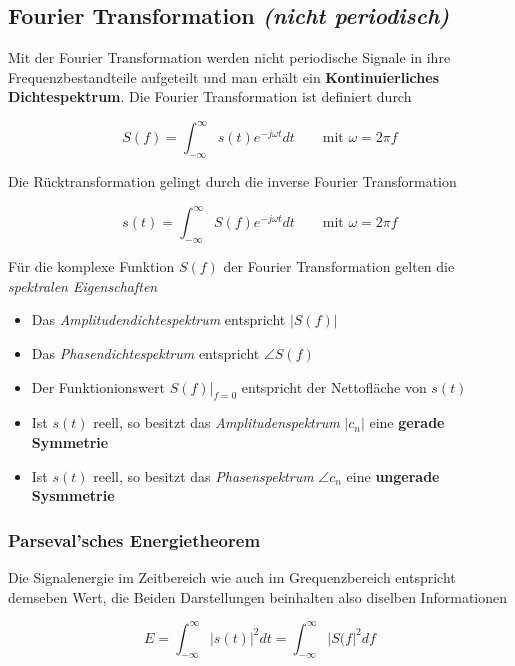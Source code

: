 \documentclass[
  10pt,
  a4paper,
  german]{article}
\numberwithin{equation}{section}
\begin{document}
\hypertarget{fourier-transformation-nicht-periodisch}{%
\subsection{\texorpdfstring{Fourier Transformation \emph{(nicht
periodisch)}}{Fourier Transformation (nicht periodisch)}}\label{fourier-transformation-nicht-periodisch}}

Mit der Fourier Transformation werden nicht periodische Signale in ihre
Frequenzbestandteile aufgeteilt und man erhält ein
\textbf{Kontinuierliches Dichtespektrum}. Die Fourier Transformation ist
definiert durch

\[
S(f)=\int_{-\infty}^{\infty}{s(t)e^{-j\omega t}dt}\qquad\text{mit }\omega=2\pi f
\]

Die Rücktransformation gelingt durch die inverse Fourier Transformation

\[
s(t)=\int_{-\infty}^{\infty}{S(f)e^{-j\omega t}dt}\qquad\text{mit }\omega=2\pi f
\]

Für die komplexe Funktion \(S(f)\) der Fourier Transformation gelten die
\emph{spektralen Eigenschaften}

\begin{itemize}
\item
  Das \emph{Amplitudendichtespektrum} entspricht \(|S(f)|\)
\item
  Das \emph{Phasendichtespektrum} entspricht \(\angle S(f)\)
\item
  Der Funktionionswert \(S(f)\big|_{f=0}\) entspricht der Nettofläche
  von \(s(t)\)
\item
  Ist \(s(t)\) reell, so besitzt das \emph{Amplitudenspektrum} \(|c_n|\)
  eine \textbf{gerade Symmetrie}
\item
  Ist \(s(t)\) reell, so besitzt das \emph{Phasenspektrum}
  \(\angle c_n\) eine \textbf{ungerade Sysmmetrie}
\end{itemize}

\hypertarget{parsevalsches-energietheorem}{%
\subsubsection{Parseval'sches
Energietheorem}\label{parsevalsches-energietheorem}}

Die Signalenergie im Zeitbereich wie auch im Grequenzbereich entspricht
demseben Wert, die Beiden Darstellungen beinhalten also diselben
Informationen

\[
E=\int_{-\infty}^{\infty}{|s(t)|^2dt}=\int_{-\infty}^{\infty}{|S(f|^2df}
\]
\end{document}
